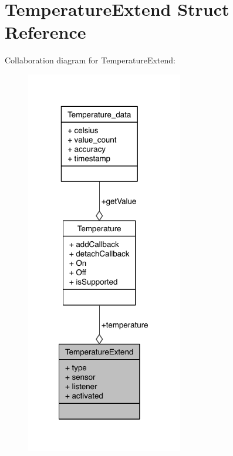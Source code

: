 \section{Temperature\-Extend Struct Reference}
\label{structTemperatureExtend}


Collaboration diagram for Temperature\-Extend\-:
\nopagebreak
\begin{figure}[H]
\begin{center}
\leavevmode
\includegraphics[width=194pt]{structTemperatureExtend__coll__graph}
\end{center}
\end{figure}
